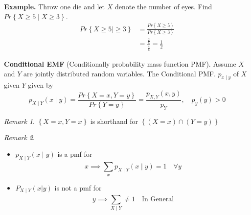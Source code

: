 \documentclass{article}
\theoremstyle{remark}
\newtheorem*{remark}{Remark}
\begin{document}

\begin{tcolorbox}
  \textbf{Example.} Throw one die and let $X$ denote the number of eyes. Find $Pr \left \{ X \ge 5  \mid X \ge 3 \right \} $.  \[
    \begin{split}
      Pr \left \{ X \ge 5     \mid  \ge 3 \right \} &= \frac{Pr \left \{ X \ge 5 \right \} }{ Pr \left \{   X \ge 3\right \} }  \\
  &=  \frac{\frac{2}{6}}{ \frac{4}{6}}  = \frac{1}{2} 
    \end{split} 
  \]  
\end{tcolorbox}

\begin{definition}
  \textbf{Conditional EMF} (Conditionally probability mass function PMF).  Assume $X$ and $Y$ are jointly distributed random variables.  The Conditional PMF.  $p_{x \mid y} $ of $X$ given $Y$ given by \[
  p_{X \mid  Y} \left( x  \mid y \right) = \frac{Pr \left \{ X = x , Y = y \right \} }{Pr \left \{ Y = y \right \} }  = \frac{p_{X,Y}\left( x,y \right)}{p_{Y}} ,  \quad p_{y} \left( y \right) > 0  
  \] 
\end{definition}

\begin{remark}
  $\left\{ X = x, Y =x \right\}$ is shorthand for $\left\{ \left( X = x \right) \cap \left( Y = y \right) \right\}$
\end{remark}
\begin{remark}
  \par
  \begin{itemize}
    \item $ p _{X \mid  Y} \left( x  \mid y \right) $ is a pmf for \[
    x  \implies  \sum_{x}^{} p_{X \mid Y} \left( x  \mid  y \right) = 1 \quad \forall  y   
    \] 
  \item $P_{X \mid  Y} \left( x|y \right) $ is not a pmf for \[
  y \implies  \sum_{X \mid Y}^{} \neq 1 \quad \text{In General}  
  \] 
  \end{itemize}
\end{remark}
\end{document}
